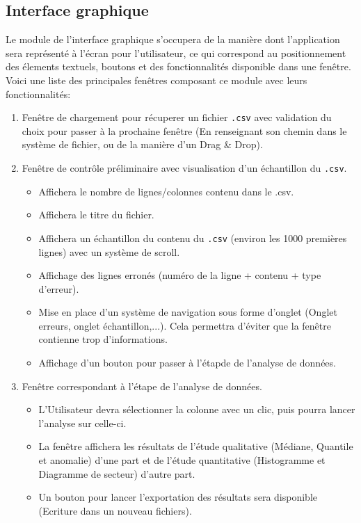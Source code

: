 		\subsection{Interface graphique}
			Le module de l'interface graphique s'occupera de la manière dont l'application sera représenté à l'écran pour l'utilisateur, ce qui correspond au positionnement des élements textuels, boutons et des fonctionnalités disponible dans une fenêtre. Voici une liste des principales fenêtres composant ce module avec leurs fonctionnalités:
			\begin{enumerate}
			\item Fenêtre de chargement pour récuperer un fichier \lstinline!.csv! avec validation du choix pour passer à la prochaine fenêtre (En renseignant son chemin dans le système de fichier, ou de la manière d'un Drag \& Drop).
			\item Fenêtre de contrôle préliminaire avec visualisation d'un échantillon du \lstinline!.csv!.		
				\begin{itemize}
				\item Affichera le nombre de lignes/colonnes contenu dans le .csv.
				\item Affichera le titre du fichier.
				\item Affichera un échantillon du contenu du \lstinline!.csv! (environ les 1000 premières lignes) avec un système de scroll.
				\item Affichage des lignes erronés (numéro de la ligne + contenu + type d'erreur).
				\item Mise en place d'un système de navigation sous forme d'onglet (Onglet erreurs, onglet échantillon,...). Cela permettra d'éviter que la fenêtre contienne trop d'informations.
				\item Affichage d'un bouton pour passer à l'étapde de l'analyse de données.
				\end{itemize}
			\item Fenêtre correspondant à l'étape de l'analyse de données.
				\begin{itemize}
				\item L'Utilisateur devra sélectionner la colonne avec un clic, puis pourra lancer l'analyse sur celle-ci.
				\item La fenêtre affichera les résultats de l'étude qualitative (Médiane, Quantile et anomalie) d'une part et de l'étude quantitative (Histogramme et Diagramme de secteur) d'autre part.
				\item Un bouton pour lancer l'exportation des résultats sera disponible (Ecriture dans un nouveau fichiers).
				\end{itemize}
			\end{enumerate}
		
		
	

